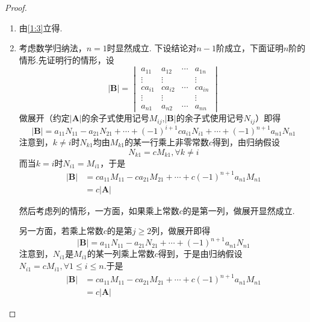 {\begin{proof}
\begin{enumerate}[label = {\textup{(\arabic*)}}]
                  因为$\left|\bm{A}\right|$是下三角行列式即$a_{ij}=0,\forall i<j$，所以$M_{k1},\forall 1\leqslant k\leqslant n$均是下三角行列式并且断言$k\geqslant 2$时$M_{k1}$必定有零主对角元.事实上，$b_{k-1,k-1}=a_{k-1,k}=0$即得.于是由归纳假设$M_{k1}=0,\forall k\geqslant 2,M_{11}=a_{22}\cdots a_{nn}\Longrightarrow \left|\bm{A}\right|=a_{11}a_{22}\cdots a_{nn}.$证毕.
            \item 由\ref{1:3}立得.
            \item 考虑数学归纳法，$n=1$时显然成立.
                  下设结论对$n-1$阶成立，下面证明$n$阶的情形.先证明行的情形，设
                  \[
                      \left|\bm{B}\right|=\begin{vmatrix}
                          a_{11}  & a_{12}  & \cdots & a_{1n}  \\
                          \vdots  & \vdots  &        & \vdots  \\
                          ca_{i1} & ca_{i2} & \cdots & ca_{in} \\
                          \vdots  & \vdots  &        & \vdots  \\
                          a_{n1}  & a_{n2}  & \cdots & a_{nn}
                      \end{vmatrix}
                  \]做展开（约定$\left|\bm{A}\right|$的余子式使用记号$M_{ij}$,$\left|\bm{B}\right|$的余子式使用记号$N_{ij}$）即得\[
                      \left|\bm{B}\right|=a_{11}N_{11}-a_{21}N_{21}+\cdots+(-1)^{i+1}ca_{i1}N_{i1}+\cdots+(-1)^{n+1}a_{n1}N_{n1}
                  \]注意到，$k\neq i$时$N_{k1}$均由$M_{k1}$的某一行乘上非零常数$c$得到，由归纳假设\[N_{k1}=cM_{k1},\forall k\neq i\]而当$k=i$时$N_{i1}=M_{i1}$，于是\begin{align*}
                      \left|\bm{B}\right| & =ca_{11}M_{11}-ca_{21}M_{21}+\cdots+c(-1)^{n+1}a_{n1}M_{n1} \\
                                          & =c\left|\bm{A}\right|
                  \end{align*}

                  然后考虑列的情形，一方面，如果乘上常数$c$的是第一列，做展开显然成立.

                  另一方面，若乘上常数$c$的是第$j\geqslant 2$列，做展开即得\[
                      \left|\bm{B}\right|=a_{11}N_{11}-a_{21}N_{21}+\cdots+(-1)^{n+1}a_{n1}N_{n1}
                  \]注意到，$N_{i1}$是$M_{i1}$的某一列乘上常数$c$得到，于是由归纳假设$N_{i1}=cM_{i1},\forall 1\leqslant i\leqslant n.$于是\begin{align*}
                      \left|\bm{B}\right| & =ca_{11}M_{11}-ca_{21}M_{21}+\cdots+c(-1)^{n+1}a_{n1}M_{n1} \\
                                          & =c\left|\bm{A}\right|
                  \end{align*}


\end{enumerate}
\end{proof}}
